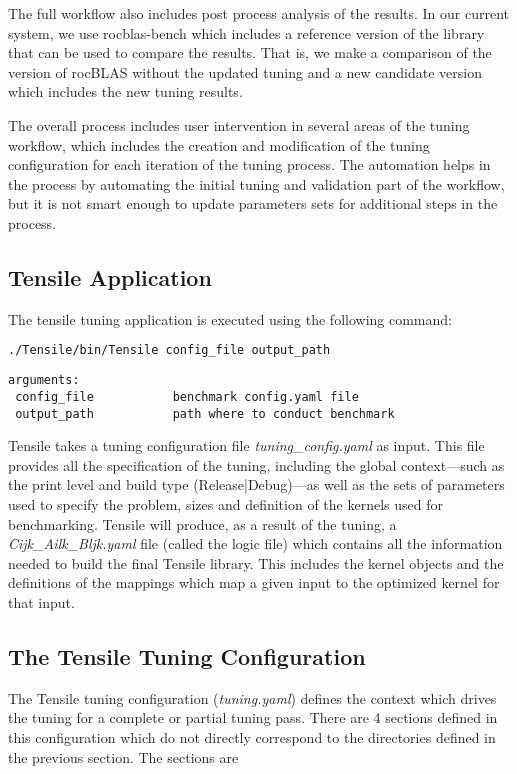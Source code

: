 \documentclass[]{article}
\begin{document}
The full workflow also includes post process analysis of the results. In our current system, we use rocblas-bench which includes a reference version of the library that can be used to compare the results. That is, we make a comparison of the version of rocBLAS without the updated tuning and a new candidate version which includes the new tuning results.

The overall process includes user intervention in several areas of the tuning workflow, which includes the creation and modification of the tuning configuration for each iteration of the tuning process. The automation helps in the process by automating the initial tuning and validation part of the workflow, but it is not smart enough to update parameters sets for additional steps in the process.

\subsection{Tensile Application}
The tensile tuning application is executed using the following command:

\begin{lstlisting}[language=bash]
./Tensile/bin/Tensile config_file output_path
\end{lstlisting}

\begin{lstlisting}
arguments:
 config_file           benchmark config.yaml file
 output_path           path where to conduct benchmark
\end{lstlisting}

Tensile takes a tuning configuration file \emph{tuning\_config.yaml} as input. This file provides all the specification of the tuning, including the global context---such as the print level and build type (Release|Debug)---as well as the sets of parameters used to specify the problem, sizes and definition of the kernels used for benchmarking. Tensile will produce, as a result of the tuning, a \emph{Cijk\_Ailk\_Bljk.yaml} file (called the logic file) which contains all the information needed to build the final Tensile library. This includes the kernel objects and the definitions of the mappings which map a given input to the optimized kernel for that input.


\subsection{The Tensile Tuning Configuration}

The Tensile tuning configuration (\emph{tuning.yaml}) defines the context which drives the tuning for a complete or partial tuning pass. There are 4 sections defined in this configuration which do not directly correspond to the directories defined in the previous section. The sections are
\end{document}

